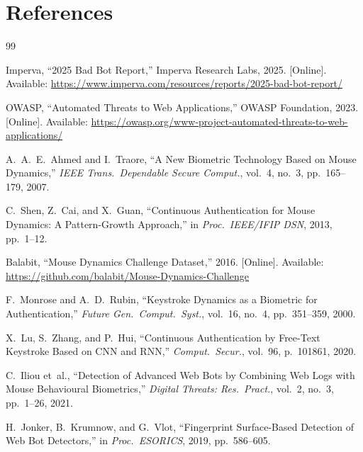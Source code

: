 \documentclass[12pt, a4paper]{article}
\begin{document}
\section*{References}

\renewcommand{\refname}{}
\vspace{-1em}

\begin{thebibliography}{99}
\small

Imperva, ``2025 Bad Bot Report,'' Imperva Research Labs, 2025. [Online]. Available: \url{https://www.imperva.com/resources/reports/2025-bad-bot-report/}

OWASP, ``Automated Threats to Web Applications,'' OWASP Foundation, 2023. [Online]. Available: \url{https://owasp.org/www-project-automated-threats-to-web-applications/}

A.~A.~E.~Ahmed and I.~Traore, ``A New Biometric Technology Based on Mouse Dynamics,'' \textit{IEEE Trans.\ Dependable Secure Comput.}, vol.~4, no.~3, pp.~165--179, 2007.

C.~Shen, Z.~Cai, and X.~Guan, ``Continuous Authentication for Mouse Dynamics: A Pattern-Growth Approach,'' in \textit{Proc.\ IEEE/IFIP DSN}, 2013, pp.~1--12.

Balabit, ``Mouse Dynamics Challenge Dataset,'' 2016. [Online]. Available: \url{https://github.com/balabit/Mouse-Dynamics-Challenge}

F.~Monrose and A.~D.~Rubin, ``Keystroke Dynamics as a Biometric for Authentication,'' \textit{Future Gen.\ Comput.\ Syst.}, vol.~16, no.~4, pp.~351--359, 2000.

X.~Lu, S.~Zhang, and P.~Hui, ``Continuous Authentication by Free-Text Keystroke Based on CNN and RNN,'' \textit{Comput.\ Secur.}, vol.~96, p.~101861, 2020.

C.~Iliou et~al., ``Detection of Advanced Web Bots by Combining Web Logs with Mouse Behavioural Biometrics,'' \textit{Digital Threats: Res.\ Pract.}, vol.~2, no.~3, pp.~1--26, 2021.

H.~Jonker, B.~Krumnow, and G.~Vlot, ``Fingerprint Surface-Based Detection of Web Bot Detectors,'' in \textit{Proc.\ ESORICS}, 2019, pp.~586--605.


\end{thebibliography}
\end{document}
